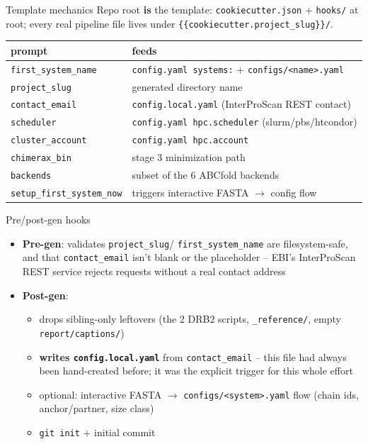 \documentclass[aspectratio=169]{beamer}
\begin{document}
\begin{frame}{Template mechanics}
  \footnotesize
  Repo root \textbf{is} the template: \texttt{cookiecutter.json} +
  \texttt{hooks/} at root; every real pipeline file lives under
  \texttt{\{\{cookiecutter.project\_slug\}\}/}.

  \vspace{0.6em}
  \begin{center}
  \begin{tabular}{@{}ll@{}}
    \toprule
    prompt & feeds \\
    \midrule
    \texttt{first\_system\_name} & \texttt{config.yaml systems:} + \texttt{configs/<name>.yaml} \\
    \texttt{project\_slug} & generated directory name \\
    \texttt{contact\_email} & \texttt{config.local.yaml} (InterProScan REST contact) \\
    \texttt{scheduler} & \texttt{config.yaml hpc.scheduler} (slurm/pbs/htcondor) \\
    \texttt{cluster\_account} & \texttt{config.yaml hpc.account} \\
    \texttt{chimerax\_bin} & stage 3 minimization path \\
    \texttt{backends} & subset of the 6 ABCfold backends \\
    \texttt{setup\_first\_system\_now} & triggers interactive FASTA $\to$ config flow \\
    \bottomrule
  \end{tabular}
  \end{center}
\end{frame}

\begin{frame}{Pre/post-gen hooks}
  \begin{itemize}
    \item \textbf{Pre-gen}: validates \texttt{project\_slug}/
      \texttt{first\_system\_name} are filesystem-safe, and that
      \texttt{contact\_email} isn't blank or the placeholder -- EBI's
      InterProScan REST service rejects requests without a real contact
      address
    \item \textbf{Post-gen}:
      \begin{itemize}
        \item drops sibling-only leftovers (the 2 DRB2 scripts,
          \texttt{\_reference/}, empty \texttt{report/captions/})
        \item \textbf{writes \texttt{config.local.yaml}} from
          \texttt{contact\_email} -- this file had always been
          hand-created before; it was the explicit trigger for this whole
          effort
        \item optional: interactive FASTA $\to$
          \texttt{configs/<system>.yaml} flow (chain ids, anchor/partner,
          size class)
        \item \texttt{git init} + initial commit
      \end{itemize}
  \end{itemize}
\end{frame}
\end{document}
